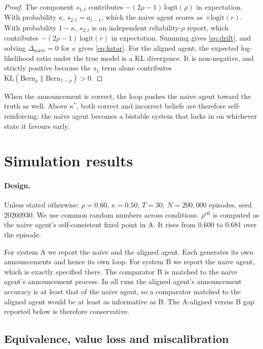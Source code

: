 \documentclass[11pt]{article}
\theoremstyle{definition}
\theoremstyle{remark}
\newcommand{\reff}{\rho^{\mathrm{eff}}}
\begin{document}
\begin{proof}
The component $s_{1,t}$ contributes $-(2\rho-1)\,\mathrm{logit}(\rho)$ in
expectation. With probability $\kappa$, $s_{2,t}=a_{t-1}$, which the naive agent
scores as $+\mathrm{logit}(r)$. With probability $1-\kappa$, $s_{2,t}$ is an
independent reliability-$\rho$ report, which contributes
$-(2\rho-1)\,\mathrm{logit}(r)$ in expectation. Summing gives \eqref{eq:drift},
and solving $\Delta_{\text{naive}}=0$ for $\kappa$ gives \eqref{eq:kstar}. For
the aligned agent, the expected log-likelihood ratio under the true model is a
KL divergence. It is non-negative, and strictly positive because the $s_1$ term
alone contributes $\mathrm{KL}(\mathrm{Bern}_\rho\|\mathrm{Bern}_{1-\rho})>0$.
\end{proof}

When the announcement is correct, the loop pushes the naive agent toward the
truth as well. Above $\kappa^\ast$, both correct and incorrect beliefs are
therefore self-reinforcing: the naive agent becomes a bistable system that locks
in on whichever state it favours early.

\section{Simulation results}\label{sec:results}

\paragraph{Design.} Unless stated otherwise: $\rho=0.60$, $\kappa=0.50$, $T=30$,
$N=200{,}000$ episodes, seed 20260930. We use common random numbers across
conditions. $\reff$ is computed as the naive agent's self-consistent fixed point
in A. It rises from 0.600 to 0.681 over the episode.

For system A we report the naive and the aligned agent. Each generates its own
announcements and hence its own loop. For system B we report the naive agent,
which is exactly specified there. The comparator B is matched to the naive
agent's announcement process. In all runs the aligned agent's announcement
accuracy is at least that of the naive agent, so a comparator matched to the
aligned agent would be at least as informative as B. The A-aligned versus B gap
reported below is therefore conservative.

\subsection{Equivalence, value loss and miscalibration}
\end{document}
